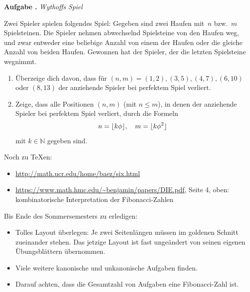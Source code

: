 \documentclass[a4paper,ngerman]{scrartcl}
\newlength{\aufgabenskip}
\newcounter{aufgabennummer}
\newenvironment{aufgabe}[1]{
  \addtocounter{aufgabennummer}{1}
  \textbf{Aufgabe \theaufgabennummer.} \emph{#1} \par
}{\vspace{\aufgabenskip}}
\newcommand{\NN}{\mathbb{N}}
\DeclarePairedDelimiter{\floor}{\lfloor}{\rfloor}
\begin{document}
\begin{aufgabe}{Wythoffs Spiel}
Zwei Spieler spielen folgendes Spiel: Gegeben sind zwei Haufen mit~$n$
bzw.~$m$ Spielsteinen. Die Spieler nehmen abwechselnd Spielsteine von
den Haufen weg, und zwar entweder eine beliebige Anzahl von einem der
Haufen oder die gleiche Anzahl von beiden Haufen. Gewonnen hat der
Spieler, der die letzten Spielsteine wegnimmt.
\begin{enumerate}
\item Überzeige dich davon, dass für $(n,m) = (1,2),(3,5),(4,7),(6,10)$
oder $(8,13)$ der anziehende Spieler bei perfektem Spiel verliert.
\item Zeige, dass alle Positionen $(n,m)$ (mit $n\leq m$), in denen der
anziehende Spieler bei perfektem Spiel verliert, durch die Formeln
\[ n = \floor{k\phi}, \quad m = \floor{k\phi^2} \]
mit $k\in\NN$ gegeben sind.
\end{enumerate}
\end{aufgabe}

\vfill

Noch zu \TeX{}en:
\begin{itemize}
\item \url{http://math.ucr.edu/home/baez/six.html}
\item \url{https://www.math.hmc.edu/~benjamin/papers/DIE.pdf}, Seite 4, oben:
kombinatorische Interpretation der Fibonacci-Zahlen
\end{itemize}

Bis Ende des Sommersemesters zu erledigen:
\begin{itemize}
\item Tolles Layout überlegen: Je zwei Seitenlängen müssen im goldenen Schnitt
zueinander stehen. Das jetzige Layout ist fast ungeändert von seinen eigenen
Übungsblättern übernommen.
\item Viele weitere kanonische und unkanonische Aufgaben finden.
\item Darauf achten, dass die Gesamtzahl von Aufgaben eine Fibonacci-Zahl ist.
\end{itemize}
\end{document}
